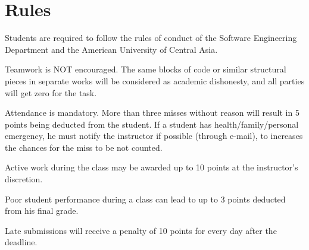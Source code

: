 \documentclass[12pt,a4paper,oneside]{article}
\begin{document}
    \section{Rules}

        Students are required to follow the rules of conduct of the Software
        Engineering Department and the American University of Central Asia.

        Teamwork is NOT encouraged. The same blocks of code or similar
        structural pieces in separate works will be considered as academic
        dishonesty, and all parties will get zero for the task.

        Attendance is mandatory. More than three misses without reason will
        result in 5 points being deducted from the student. If a student has
        health/family/personal emergency, he must notify the instructor if
        possible (through e-mail), to increases the chances for the miss to be
        not counted.

        Active work during the class may be awarded up to 10 points at the
        instructor’s discretion.

        Poor student performance during a class can lead to up to 3 points
        deducted from his final grade.

        Late submissions will receive a penalty of 10 points for every day after
        the deadline.
\end{document}

